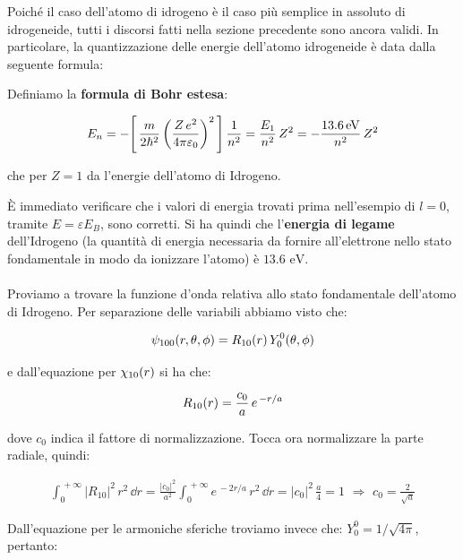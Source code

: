 	Poiché il caso dell'atomo di idrogeno è il caso più semplice in assoluto di idrogeneide, tutti i discorsi fatti nella sezione precedente sono ancora validi. In particolare, la quantizzazione delle energie dell'atomo idrogeneide è data dalla seguente formula:
	
\begin{mydef}
	Definiamo la \textbf{formula di Bohr estesa}:

\begin{align*}
	E_n = - \qty[\, \frac{m}{2\hbar^2} \, \qty(\frac{Z \, e^2}{4\pi\varepsilon_0})^2   \,] \, \frac{1}{n^2} = \frac{E_1}{n^2} \, Z^2 = - \frac{13.6 \, \text{eV}}{n^2} \, Z^2
\end{align*}

	che per $Z = 1$ da l'energie dell'atomo di Idrogeno.

\end{mydef}

	È immediato verificare che i valori di energia trovati prima nell'esempio di $l = 0$, tramite $E = \varepsilon E_B$, sono corretti. Si ha quindi che l'\textbf{energia di legame} dell'Idrogeno (la quantità di energia necessaria da fornire all'elettrone nello stato fondamentale in modo da ionizzare l'atomo) è $13.6 \, \, \text{eV}$.
	\\
	\\
	Proviamo a trovare la funzione d'onda relativa allo stato fondamentale dell'atomo di Idrogeno. Per separazione delle variabili abbiamo visto che:
	
\begin{align*}
	\psi_{100} \qty(r, \theta, \phi) = R_{10}\qty(r) \, Y_0^0\qty(\theta, \phi)
\end{align*}

	e dall'equazione per $\chi_{10}\qty(r)$ si ha che:
	
\begin{align*}
	R_{10}\qty(r) = \frac{c_0}{a} \, e^{\, -r/a}
\end{align*}

	dove $c_0$ indica il fattore di normalizzazione. Tocca ora normalizzare la parte radiale, quindi:
	
\begin{align*}
	\int_0^{\, +\infty} |R_{10}|^2 \, r^2 \, \dd r = \frac{|c_0|^2}{a^2}\int_0^{\, +\infty} e^{\, -2r/a} \, r^2 \, \dd r = |c_0|^2 \, \frac{a}{4} = 1 \, \, \Rightarrow \, \, c_0 = \frac{2}{\sqrt{a}}
\end{align*}

	Dall'equazione per le armoniche sferiche troviamo invece che: $Y_0^0 = 1/\sqrt{4\pi}$, pertanto:
	
